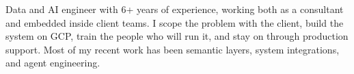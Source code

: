 \documentclass{template/silvia-resume}
\begin{document}

Data and AI engineer with 6+ years of experience, working both as a consultant and embedded inside client teams. I scope the problem with the client, build the system on GCP, train the people who will run it, and stay on through production support. Most of my recent work has been semantic layers, system integrations, and agent engineering.

\ForwardDeployedSkills

\begin{ResumeBullets}
  \ConsultingFullLifecycle
  \PlaytomicSemanticLayerPlatform
  \PlaytomicMcpSemanticLayer
  \PlaytomicMcpAdoption
  \PlaytomicAdkAgents
\end{ResumeBullets}


\PlaytomicLeadRole
\begin{ResumeBullets}
  \PlaytomicSelfServeFramework
  \PlaytomicBeamFramework
  \PlaytomicLatencyAndLiveProducts
  \PlaytomicObservability
\end{ResumeBullets}

\PlaytomicSeniorRole
\begin{ResumeBullets}
  \PlaytomicIngestion
  \PlaytomicTerraform
  \PlaytomicIntegrations
\end{ResumeBullets}

\SiftiaRole
\begin{ResumeBullets}
  \SiftiaQueryRefactor
  \SiftiaReportingAndMigration
\end{ResumeBullets}

\newpage
{}

\WorkyRole
\begin{ResumeBullets}
  \WorkyPipelines
  \WorkyWarehouse
  \WorkyReporting
\end{ResumeBullets}

\MatchCraftRole
\begin{ResumeBullets}
  \MatchCraftImpact
\end{ResumeBullets}

\MmiRole
\begin{ResumeBullets}
  \MmiGeolocation
  \MmiHealthCheck
  \MmiMarketingAutomation
\end{ResumeBullets}

\BMetricsRole
\begin{ResumeBullets}
  \BMetricsImpact
\end{ResumeBullets}
\end{document}
